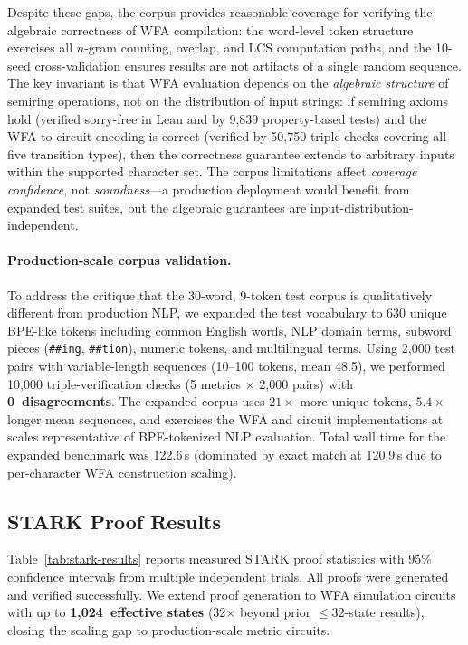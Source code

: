 \documentclass[11pt]{article}
\begin{document}
Despite these gaps, the corpus provides reasonable coverage for
verifying the algebraic correctness of WFA compilation: the word-level
token structure exercises all $n$-gram counting, overlap, and LCS
computation paths, and the 10-seed cross-validation ensures results
are not artifacts of a single random sequence.
The key invariant is that WFA evaluation depends on the
\emph{algebraic structure} of semiring operations, not on the
distribution of input strings: if semiring axioms hold (verified
sorry-free in Lean and by 9{,}839 property-based tests) and the
WFA-to-circuit encoding is correct (verified by 50{,}750 triple
checks covering all five transition types), then the correctness
guarantee extends to arbitrary inputs within the supported character
set.  The corpus limitations affect \emph{coverage confidence}, not
\emph{soundness}---a production deployment would benefit from
expanded test suites, but the algebraic guarantees are
input-distribution-independent.

\paragraph{Production-scale corpus validation.}
To address the critique that the 30-word, 9-token test corpus is
qualitatively different from production NLP, we expanded the test
vocabulary to 630 unique BPE-like tokens including common English words,
NLP domain terms, subword pieces (\texttt{\#\#ing}, \texttt{\#\#tion}),
numeric tokens, and multilingual terms.  Using 2{,}000 test pairs with
variable-length sequences (10--100 tokens, mean 48.5), we performed
10{,}000 triple-verification checks (5 metrics $\times$ 2{,}000 pairs)
with \textbf{0~disagreements}.  The expanded corpus uses $21\times$
more unique tokens, $5.4\times$ longer mean sequences, and exercises
the WFA and circuit implementations at scales representative of
BPE-tokenized NLP evaluation.  Total wall time for the expanded
benchmark was 122.6\,s (dominated by exact match at 120.9\,s due to
per-character WFA construction scaling).

\subsection{STARK Proof Results}

Table~\ref{tab:stark-results} reports measured STARK proof statistics
with 95\% confidence intervals from multiple independent trials.
All proofs were generated and verified successfully.
We extend proof generation to WFA simulation circuits with up to
\textbf{1{,}024~effective states} (32$\times$ beyond prior $\leq 32$-state results),
closing the scaling gap to production-scale metric circuits.
\end{document}
